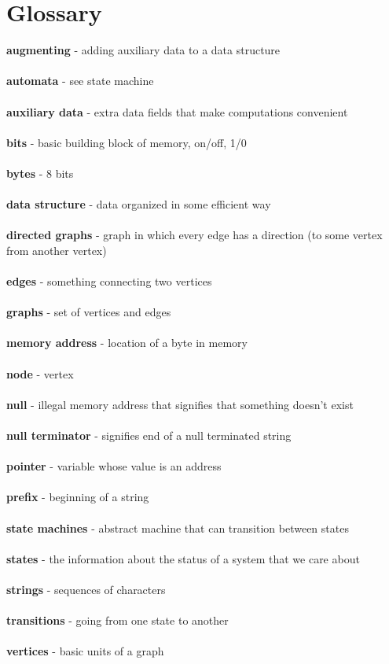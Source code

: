 \documentclass[12pt]{article}
\begin{document}
\section{Glossary}
\textbf{augmenting} - adding auxiliary data to a data structure\\ \\
\textbf{automata} - see state machine\\ \\
\textbf{auxiliary data} - extra data fields that make computations convenient\\ \\
\textbf{bits} - basic building block of memory, on/off, 1/0\\ \\
\textbf{bytes} - 8 bits\\ \\
\textbf{data structure} - data organized in some efficient way\\ \\
\textbf{directed graphs} - graph in which every edge has a direction (to some vertex from another vertex)\\ \\
\textbf{edges} - something connecting two vertices\\ \\
\textbf{graphs} - set of vertices and edges\\ \\
\textbf{memory address} - location of a byte in memory\\ \\
\textbf{node} - vertex\\ \\
\textbf{null} - illegal memory address that signifies that something doesn't exist\\ \\
\textbf{null terminator} - signifies end of a null terminated string\\ \\
\textbf{pointer} - variable whose value is an address\\ \\
\textbf{prefix} - beginning of a string \\ \\
\textbf{state machines} - abstract machine that can transition between states\\ \\
\textbf{states} - the information about the status of a system that we care about\\ \\
\textbf{strings} - sequences of characters\\ \\
\textbf{transitions} - going from one state to another \\ \\
\textbf{vertices} - basic units of a graph
\end{document}
